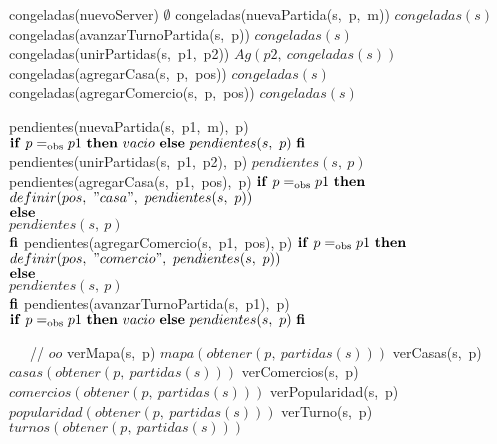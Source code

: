 \begin{tad}{}
        \tadAxioma
            {congeladas(nuevoServer)}
            {$\emptyset$}         
        \tadAxioma    
            {congeladas(nuevaPartida(s,\ p,\ m))}
            {$congeladas(s)$}
        \tadAxioma
            {congeladas(avanzarTurnoPartida(s,\ p))}
            {$congeladas(s)$}
        \tadAxioma
            {congeladas(unirPartidas(s,\ p1,\ p2))}
            {$Ag(p2,\ congeladas(s))$}
        \tadAxioma
            {congeladas(agregarCasa(s,\ p,\ pos))}
            {$congeladas(s)$}
        \tadAxioma
            {congeladas(agregarComercio(s,\ p,\ pos))}
            {$congeladas(s)$}

        \tadAxioma
            {pendientes(nuevaPartida(s,\ p1,\ m),\ p)}
            {$\LIF\ p \igobs p1\ \LTHEN\ vacio\ \LELSE\ pendientes(s,\ p)\ \LFI$}
        \tadAxioma
            {pendientes(unirPartidas(s,\ p1,\ p2),\ p)}
            {$pendientes(s,\ p)$}
        \tadAxioma
            {pendientes(agregarCasa(s,\ p1,\ pos),\ p)}
            {$\textrm{\textbf{if}}\ p =_{\mathrm{obs}} p1\ \textrm{\textbf{then}}\ $\\$
            $\tab$ definir(pos,\ "casa",\ pendientes(s,\ p)) $\\$
            \textrm{\textbf{else}}\ $\\$
            $\tab$ pendientes(s,\ p)\ $\\$
            \textrm{\textbf{fi}}$}
        \tadAxioma
            {pendientes(agregarComercio(s,\ p1,\ pos), p)}
            {$\textrm{\textbf{if}}\ p =_{\mathrm{obs}} p1\ \textrm{\textbf{then}}\ $\\$
            $\tab$ definir(pos,\ "comercio",\ pendientes(s,\ p)) $\\$
            \textrm{\textbf{else}}\ $\\$
            $\tab$ pendientes(s,\ p)\ $\\$
            \textrm{\textbf{fi}}$}     
        \tadAxioma
            {pendientes(avanzarTurnoPartida(s,\ p1),\ p)}
            {$\LIF\ p \igobs p1\ \LTHEN\ vacio\ \LELSE\ pendientes(s,\ p)\ \LFI$} 
        
        \ \ \ // $oo$
        \tadAxioma
            {verMapa(s,\ p)}
            {$ mapa(obtener(p,\ partidas(s)))$}
        \tadAxioma
            {verCasas(s,\ p)}
            {$casas(obtener(p,\ partidas(s)))$}
        \tadAxioma
            {verComercios(s,\ p)}
            {$comercios(obtener(p,\ partidas(s)))$}
        \tadAxioma
            {verPopularidad(s,\ p)}
            {$popularidad(obtener(p,\ partidas(s)))$}
        \tadAxioma
            {verTurno(s,\ p)}
            {$turnos(obtener(p,\ partidas(s)))$}
        
\end{tad}


